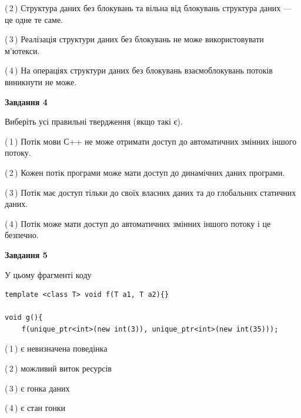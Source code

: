 \documentclass[12pt, ukrainian]{article}
\begin{document}
\begin {large}
{(\,2\,) Структура даних без блокувань та вільна від блокувань структура даних --- це одне те саме.%

(\,3\,) Реалізація структури даних без блокувань не може використовувати м’ютекси.%

(\,4\,) На операціях структури даних без блокувань взаємоблокувань потоків виникнути не може.%



\begin{center}
\textbf{Завдання 4}
\end{center}
Виберіть усі правильні твердження (якщо такі є).\par
\vspace{2mm}

(\,1\,) Потік мови С++ не може отримати доступ до автоматичних змінних іншого потоку.%

(\,2\,) Кожен потік програми може мати доступ до динамічних даних програми.%

(\,3\,) Потік має доступ тільки до своїх власних даних та до глобальних статичних даних.%

(\,4\,) Потік може мати доступ до автоматичних змінних іншого потоку і це безпечно.%



\begin{center}
\textbf{Завдання 5}
\end{center}
У цьому фрагменті коду
\begin{verbatim}
template <class T> void f(T a1, T a2){}

void g(){
    f(unique_ptr<int>(new int(3)), unique_ptr<int>(new int(35)));
\end{verbatim}

(\,1\,) є невизначена поведінка%

(\,2\,) можливий виток ресурсів%

(\,3\,) є гонка даних%

(\,4\,) є стан гонки%


}
\end {large}
\end{document}
